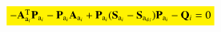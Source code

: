 \documentclass[3p]{elsarticle}
\begin{document}
    \begin{equation}
        \colorbox{yellow}{$-\mathbf{A}_{\mathrm{a}_i}^\mathrm{T}\mathbf{P}_{\mathrm{a}_{i}} - \mathbf{P}_{\mathrm{a}_{i}}\mathbf{A}_{\mathrm{a}_i}  + \mathbf{P}_{\mathrm{a}_{i}}(\mathbf{S}_{\mathrm{a}_i} - \mathbf{S}_{\mathrm{a_d}_i}) \mathbf{P}_{\mathrm{a}_{i}} - \mathbf{Q}_{i} = 0$}
    \end{equation}
    








\end{document}
